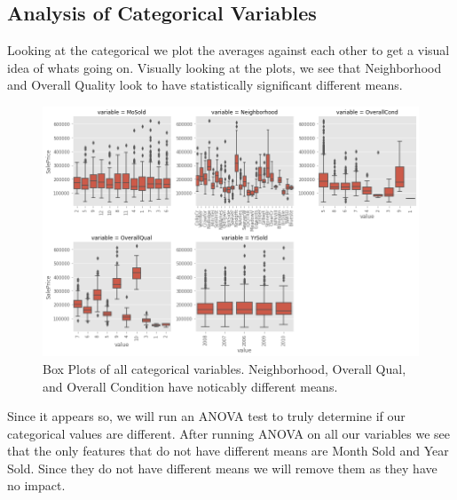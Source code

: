 \documentclass{article}
\begin{document}
	

	\subsection{Analysis of Categorical Variables}

	Looking at the categorical we plot the averages against each other to get a visual idea of whats going on. Visually looking at the plots, we see that Neighborhood and Overall Quality look to have statistically significant different means. 
	
	\begin{figure}
		\includegraphics[width=\textwidth]{catboxes}
		\caption{Box Plots of all categorical variables. Neighborhood, Overall Qual, and Overall Condition have noticably different means.}
		\label{fig:cats}
	\end{figure}
	
	Since it appears so, we will run an ANOVA test to truly determine if our categorical values are different. After running ANOVA on all our variables we see that the only features that do not have different means are Month Sold and Year Sold. Since they do not have different means we will remove them as they have no impact. 
	
\end{document}
